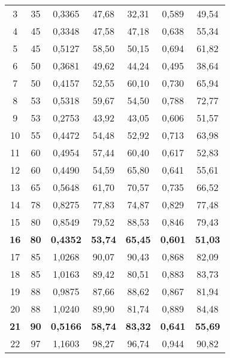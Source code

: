 \begin{table}
\begin{center}
\begin{tabular}{|c|c|c|c|c|c|c|}
\hphantom{9}3&35&0,3365&47,68&32,31&0,589&49,54\\
\hphantom{9}4&45&0,3348&47,58&47,18&0,638&55,34\\
\hphantom{9}5&45&0,5127&58,50&50,15&0,694&61,82\\
\hphantom{9}6&50&0,3681&49,62&44,24&0,495&38,64\\
\hphantom{9}7&50&0,4157&52,55&60,10&0,730&65,94\\
\hphantom{9}8&53&0,5318&59,67&54,50&0,788&72,77\\
\hphantom{9}9&53&0,2753&43,92&43,05&0,606&51,57\\
10&55&0,4472&54,48&52,92&0,713&63,98\\
11&60&0,4954&57,44&60,40&0,617&52,83\\
12&60&0,4490&54,59&65,80&0,641&55,61\\
13&65&0,5648&61,70&70,57&0,735&66,52\\
14&78&0,8275&77,83&74,87&0,829&77,48\\
15&80&0,8549&79,52&88,53&0,846&79,43\\
\textbf{16}&\textbf{80}&\textbf{0,4352}&\textbf{53,74}&\textbf{65,45}&\textbf{0,601}&
\textbf{51,03}\\
17&85&1,0268&90,07&90,43&0,868&82,09\\
18&85&1,0163&89,42&80,51&0,883&83,73\\
19&88&0,9875&87,66&88,62&0,867&81,94\\
20&88&1,0240&89,90&81,74&0,889&84,48\\
\textbf{21}&\textbf{90}&\textbf{0,5166}&\textbf{58,74}&\textbf{83,32}&\textbf{0,641}&
\textbf{55,69}\\
22&97&1,1603&98,27&96,74&0,944&90,82\\
\hline
\end{tabular}
\vspace*{4pt}
\end{center}
\end{table}

